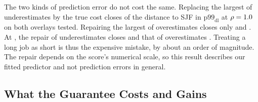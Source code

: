The two kinds of prediction error do not cost the same. Replacing the largest
 of underestimates by the true cost closes  of the distance to SJF
in $\mathrm{p99}_{\mathrm{dl}}$ at $\rho = 1.0$ on both overlays tested. Repairing
the largest  of overestimates closes only  and . At
, the repair of underestimates closes  and that of overestimates
. Treating a long job as short is thus the expensive mistake, by about an
order of magnitude. The repair depends on the score's numerical scale, so this result
describes our fitted predictor and not prediction errors in general.

\subsection{What the Guarantee Costs and Gains}
\label{sec:exp_guard}

